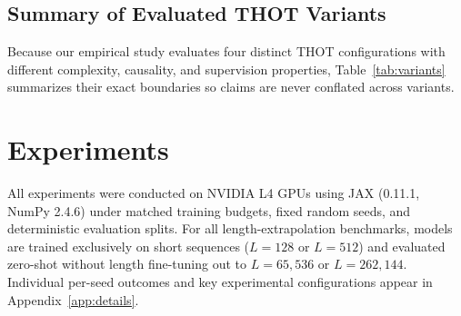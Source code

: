 \documentclass[11pt]{article}
\begin{document}
\subsection{Summary of Evaluated THOT Variants}
\label{sec:variants}

Because our empirical study evaluates four distinct THOT configurations with different complexity, causality, and supervision properties, Table~\ref{tab:variants} summarizes their exact boundaries so claims are never conflated across variants.

\begin{table}[htbp]
  \centering
  \caption{\textbf{Summary of evaluated THOT configurations.} No single configuration simultaneously attains $97.40\%$ pure-$\alpha=0$ recall, sorting-free $O(L)$ gating, and causality; each row reports the exact observed trade-off at $L=262{,}144$.}
  \label{tab:variants}
  \setlength{\tabcolsep}{4pt}
\end{table}

\section{Experiments}
\label{sec:experiments}

All experiments were conducted on NVIDIA L4 GPUs using JAX (0.11.1, NumPy 2.4.6) under matched training budgets, fixed random seeds, and deterministic evaluation splits. For all length-extrapolation benchmarks, models are trained exclusively on short sequences ($L=128$ or $L=512$) and evaluated zero-shot without length fine-tuning out to $L=65{,}536$ or $L=262{,}144$. Individual per-seed outcomes and key experimental configurations appear in Appendix~\ref{app:details}.
\end{document}
